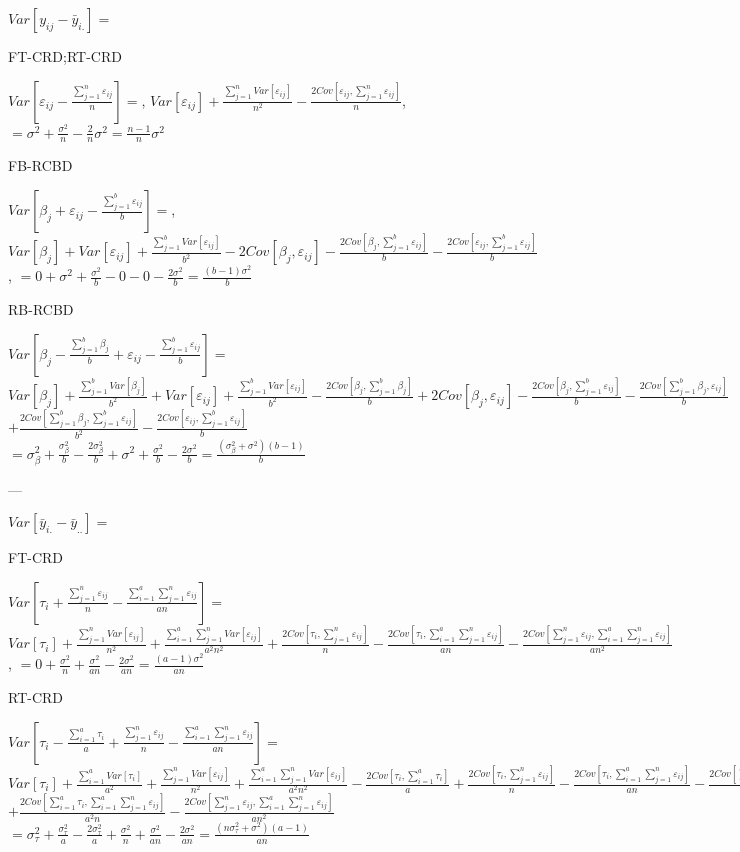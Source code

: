 \documentclass[10pt,portrait]{article}
\begin{document}
$Var[y_{ij}-\bar y_{i.}]=$

FT-CRD;RT-CRD

$Var[\varepsilon_{ij}-\frac{\sum_{j=1}^n\varepsilon_{ij}}n]=$,
$Var[\varepsilon_{ij}]+\frac{\sum_{j=1}^nVar[\varepsilon_{ij}]}{n^2}-\frac{2Cov[\varepsilon_{ij},\sum_{j=1}^n\varepsilon_{ij}]}n$,
$=\sigma^2+\frac{\sigma^2}n-\frac2n\sigma^2=\frac{n-1}n\sigma^2$

FB-RCBD

$Var[\beta_{j}+\varepsilon_{ij}-\frac{\sum_{j=1}^b\varepsilon_{ij}}b]=$,
$Var[\beta_{j}]+Var[\varepsilon_{ij}]+\frac{\sum_{j=1}^bVar[\varepsilon_{ij}]}{b^2}-2Cov[\beta_{j},\varepsilon_{ij}]-\frac{2Cov[\beta_{j},\sum_{j=1}^b\varepsilon_{ij}]}b-\frac{2Cov[\varepsilon_{ij},\sum_{j=1}^b\varepsilon_{ij}]}b$,
$=0+\sigma^2+\frac{\sigma^2}b-0-0-\frac{2\sigma^2}b=\frac{(b-1)\sigma^2}b$

RB-RCBD

$Var[\beta_{j}-\frac{\sum_{j=1}^b\beta_{j}}b+\varepsilon_{ij}-\frac{\sum_{j=1}^b\varepsilon_{ij}}b]=$
$Var[\beta_{j}]+\frac{\sum_{j=1}^bVar[\beta_{j}]}{b^2}+Var[\varepsilon_{ij}]+\frac{\sum_{j=1}^bVar[\varepsilon_{ij}]}{b^2}-\frac{2Cov[\beta_{j},\sum_{j=1}^b\beta_{j}]}b+2Cov[\beta_{j},\varepsilon_{ij}]-\frac{2Cov[\beta_{j},\sum_{j=1}^b\varepsilon_{ij}]}b-\frac{2Cov[\sum_{j=1}^b\beta_{j},\varepsilon_{ij}]}b$
$+\frac{2Cov[\sum_{j=1}^b\beta_{j},\sum_{j=1}^b\varepsilon_{ij}]}{b^2}-\frac{2Cov[\varepsilon_{ij},\sum_{j=1}^b\varepsilon_{ij}]}b$
$=\sigma_{\beta}^2+\frac{\sigma_{\beta}^2}{b}-\frac{2\sigma_{\beta}^2}{b}+\sigma^2+\frac{\sigma^2}b-\frac{2\sigma^2}b=\frac{(\sigma_{\beta}^2+\sigma^2)(b-1)}b$

 ---

$Var[\bar y_{i.}-\bar y_{..}]=$

FT-CRD

$Var[\tau_{i}+\frac{\sum_{j=1}^n\varepsilon_{ij}}n-\frac{\sum_{i=1}^a\sum_{j=1}^n\varepsilon_{ij}}{an}]=$
$Var[\tau_{i}]+\frac{\sum_{j=1}^nVar[\varepsilon_{ij}]}{n^2}+\frac{\sum_{i=1}^a\sum_{j=1}^nVar[\varepsilon_{ij}]}{a^2n^2}+\frac{2Cov[\tau_{i},\sum_{j=1}^n\varepsilon_{ij}]}{n}-\frac{2Cov[\tau_{i},\sum_{i=1}^a\sum_{j=1}^n\varepsilon_{ij}]}{an}-\frac{2Cov[\sum_{j=1}^n\varepsilon_{ij},\sum_{i=1}^a\sum_{j=1}^n\varepsilon_{ij}]}{an^2}$,
$=0+\frac{\sigma^2}{n}+\frac{\sigma^2}{an}-\frac{2\sigma^2}{an}=\frac{(a-1)\sigma^2}{an}$

RT-CRD

$Var[\tau_{i}-\frac{\sum_{i=1}^a\tau_{i}}{a}+\frac{\sum_{j=1}^n\varepsilon_{ij}}n-\frac{\sum_{i=1}^a\sum_{j=1}^n\varepsilon_{ij}}{an}]=$
$Var[\tau_{i}]+\frac{\sum_{i=1}^aVar[\tau_{i}]}{a^2}+\frac{\sum_{j=1}^nVar[\varepsilon_{ij}]}{n^2}+\frac{\sum_{i=1}^a\sum_{j=1}^nVar[\varepsilon_{ij}]}{a^2n^2}-\frac{2Cov[\tau_{i},\sum_{i=1}^a\tau_{i}]}a+\frac{2Cov[\tau_{i},\sum_{j=1}^n\varepsilon_{ij}]}n-\frac{2Cov[\tau_{i},\sum_{i=1}^a\sum_{j=1}^n\varepsilon_{ij}]}{an}-\frac{2Cov[\sum_{i=1}^a\tau_{i},\sum_{j=1}^n\varepsilon_{ij}]}{an}$
$+\frac{2Cov[\sum_{i=1}^a\tau_{i},\sum_{i=1}^a\sum_{j=1}^n\varepsilon_{ij}]}{a^2n}-\frac{2Cov[\sum_{j=1}^n\varepsilon_{ij},\sum_{i=1}^a\sum_{j=1}^n\varepsilon_{ij}]}{an^2}$
$=\sigma_{\tau}^2+\frac{\sigma_{\tau}^2}{a}-\frac{2\sigma_{\tau}^2}{a}+\frac{\sigma^2}{n}+\frac{\sigma^2}{an}-\frac{2\sigma^2}{an}=\frac{(n\sigma_{\tau}^2+\sigma^2)(a-1)}{an}$
\end{document}
